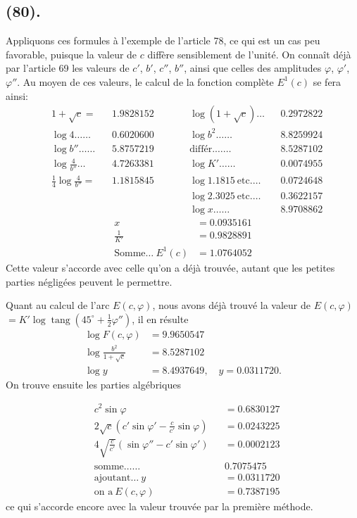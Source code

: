 \documentclass{article}
\begin{document}
\subsection*{(80).}

Appliquons ces formules à l'exemple de l'article 78, ce qui est un cas peu favorable, puisque la valeur de $c$ diffère sensiblement de l'unité. On connaît déjà par l'article 69 les valeurs de $c'$, $b'$, $c''$, $b''$, ainsi que celles des amplitudes $\varphi$, $\varphi'$, $\varphi''$. Au moyen de ces valeurs, le calcul de la fonction complète $E^{1}(c)$ se fera ainsi:
\[ \begin{aligned} &1+\sqrt{c}= && 1.9828152 &\qquad& \log(1+\sqrt{c})\ldots && 0.2972822\\ &\log 4\ldots\ldots && 0.6020600 && \log b^{2}\ldots\ldots && 8.8259924\\ &\log b''\ldots\ldots && 5.8757219 && \text{différ.}\ldots\ldots && 8.5287102\\ &\log\frac{4}{b''}\ldots && 4.7263381 && \log K'\ldots\ldots && 0.0074955\\ &\tfrac{1}{4}\log\frac{4}{b''}= && 1.1815845 && \log 1.1815\ \text{etc.}\ldots && 0.0724648\\ &&&&& \log 2.3025\ \text{etc.}\ldots && 0.3622157\\ &&&&& \log x\ldots\ldots && 8.9708862 \end{aligned} \]
\[ \begin{aligned} x&=0.0935161\\ \frac{1}{K'}&=0.9828891\\ \text{Somme}\ldots\ E^{1}(c)&=1.0764052 \end{aligned} \]
Cette valeur s'accorde avec celle qu'on a déjà trouvée, autant que les petites parties négligées peuvent le permettre.

Quant au calcul de l'arc $E(c,\varphi)$, nous avons déjà trouvé la valeur de $E(c,\varphi)$ $=K'\log\operatorname{tang}(45^{\circ}+\frac{1}{2}\varphi'')$, il en résulte
\[ \begin{aligned} \log F(c,\varphi)&=9.9650547\\ \log\frac{b^{2}}{1+\sqrt{c}}&=8.5287102\\ \log y&=8.4937649,\quad y=0.0311720. \end{aligned} \]
On trouve ensuite les parties algébriques

\[ \begin{aligned} &c^{2}\sin\varphi && =0.6830127\\ &2\sqrt{c}\left(c'\sin\varphi'-\frac{c}{c'}\sin\varphi\right) && =0.0243225\\ &4\sqrt{\frac{c}{c'}}(\sin\varphi''-c'\sin\varphi') && =0.0002123\\ &\text{somme}\ldots\ldots && 0.7075475\\ &\text{ajoutant}\ldots\ y && =0.0311720\\ &\text{on a}\ E(c,\varphi) && =0.7387195 \end{aligned} \]
ce qui s'accorde encore avec la valeur trouvée par la première méthode.
\end{document}

